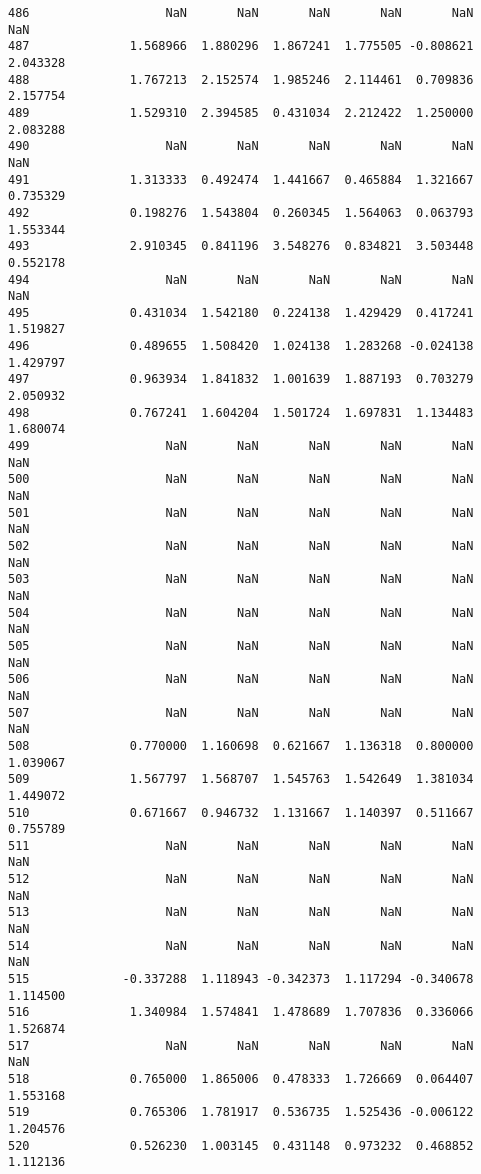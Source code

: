 \documentclass[11pt]{article}
\begin{document}
\begin{Verbatim}[commandchars=\\\{\}]
486                   NaN       NaN       NaN       NaN       NaN       NaN
487              1.568966  1.880296  1.867241  1.775505 -0.808621  2.043328
488              1.767213  2.152574  1.985246  2.114461  0.709836  2.157754
489              1.529310  2.394585  0.431034  2.212422  1.250000  2.083288
490                   NaN       NaN       NaN       NaN       NaN       NaN
491              1.313333  0.492474  1.441667  0.465884  1.321667  0.735329
492              0.198276  1.543804  0.260345  1.564063  0.063793  1.553344
493              2.910345  0.841196  3.548276  0.834821  3.503448  0.552178
494                   NaN       NaN       NaN       NaN       NaN       NaN
495              0.431034  1.542180  0.224138  1.429429  0.417241  1.519827
496              0.489655  1.508420  1.024138  1.283268 -0.024138  1.429797
497              0.963934  1.841832  1.001639  1.887193  0.703279  2.050932
498              0.767241  1.604204  1.501724  1.697831  1.134483  1.680074
499                   NaN       NaN       NaN       NaN       NaN       NaN
500                   NaN       NaN       NaN       NaN       NaN       NaN
501                   NaN       NaN       NaN       NaN       NaN       NaN
502                   NaN       NaN       NaN       NaN       NaN       NaN
503                   NaN       NaN       NaN       NaN       NaN       NaN
504                   NaN       NaN       NaN       NaN       NaN       NaN
505                   NaN       NaN       NaN       NaN       NaN       NaN
506                   NaN       NaN       NaN       NaN       NaN       NaN
507                   NaN       NaN       NaN       NaN       NaN       NaN
508              0.770000  1.160698  0.621667  1.136318  0.800000  1.039067
509              1.567797  1.568707  1.545763  1.542649  1.381034  1.449072
510              0.671667  0.946732  1.131667  1.140397  0.511667  0.755789
511                   NaN       NaN       NaN       NaN       NaN       NaN
512                   NaN       NaN       NaN       NaN       NaN       NaN
513                   NaN       NaN       NaN       NaN       NaN       NaN
514                   NaN       NaN       NaN       NaN       NaN       NaN
515             -0.337288  1.118943 -0.342373  1.117294 -0.340678  1.114500
516              1.340984  1.574841  1.478689  1.707836  0.336066  1.526874
517                   NaN       NaN       NaN       NaN       NaN       NaN
518              0.765000  1.865006  0.478333  1.726669  0.064407  1.553168
519              0.765306  1.781917  0.536735  1.525436 -0.006122  1.204576
520              0.526230  1.003145  0.431148  0.973232  0.468852  1.112136

\end{Verbatim}
\end{document}
